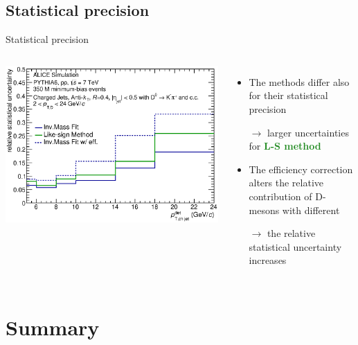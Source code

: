 \documentclass[xcolor={usenames,dvipsnames}]{beamer}
\begin{document}
\subsection{Statistical precision}
\begin{frame}{Statistical precision}
\begin{columns}
\includegraphics[width=\textwidth]{img/HQ16_Simulation_UncertaintyComparison}

\begin{itemize}
\item The methods differ also for their \alert{statistical precision}
\item[$\rightarrow$] larger uncertainties for \textbf{\textcolor{ForestGreen}{L-S method}}
\item The \alert{efficiency correction} alters the relative contribution of D-mesons with different \pt
\item[$\rightarrow$] the relative statistical uncertainty increases
\end{itemize}
\end{columns}
\end{frame}

\section*{Summary}
\end{document}
